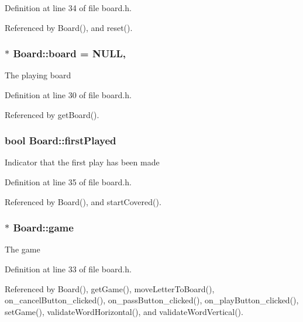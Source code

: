 Definition at line 34 of file board.\-h.



Referenced by Board(), and reset().

\hypertarget{class_board_a0a25d2a46017652371e29fa8c8dd4544}{
\subsubsection[{board}]{ $\ast$ Board\-::board = N\-U\-L\-L\hspace{0.3cm}{\ttfamily [static]}, {\ttfamily [private]}}}\label{class_board_a0a25d2a46017652371e29fa8c8dd4544}
The playing board 

Definition at line 30 of file board.\-h.



Referenced by get\-Board().

\hypertarget{class_board_aa360f3725c638c933beb5d3e3cd881d7}{
\subsubsection[{first\-Played}]{\setlength{\rightskip}{0pt plus 5cm}bool Board\-::first\-Played\hspace{0.3cm}{\ttfamily [private]}}}\label{class_board_aa360f3725c638c933beb5d3e3cd881d7}
Indicator that the first play has been made 

Definition at line 35 of file board.\-h.



Referenced by Board(), and start\-Covered().

\hypertarget{class_board_ac846e6a4ffe6621894ff8738ea59549e}{
\subsubsection[{game}]{$\ast$ Board\-::game\hspace{0.3cm}{\ttfamily [private]}}}\label{class_board_ac846e6a4ffe6621894ff8738ea59549e}
The game 

Definition at line 33 of file board.\-h.



Referenced by Board(), get\-Game(), move\-Letter\-To\-Board(), on\-\_\-cancel\-Button\-\_\-clicked(), on\-\_\-pass\-Button\-\_\-clicked(), on\-\_\-play\-Button\-\_\-clicked(), set\-Game(), validate\-Word\-Horizontal(), and validate\-Word\-Vertical().

